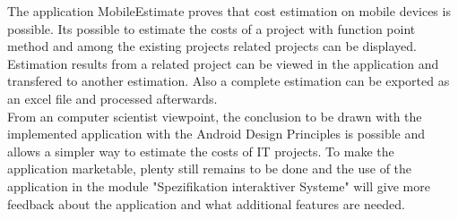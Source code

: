 The application MobileEstimate proves that cost estimation on mobile devices is possible. Its possible to estimate the costs of a project with function point method and among the existing projects related projects can be displayed. Estimation results from a related project can be viewed in the application and transfered to another estimation. Also a complete estimation can be exported as an excel file and processed afterwards.\\
From an computer scientist viewpoint, the conclusion to be drawn with the implemented application with the Android Design Principles is possible and allows a simpler way to estimate the costs of IT projects. To make the application marketable, plenty still remains to be done and the use of the application in the module "Spezifikation interaktiver Systeme" will give more feedback about the application and what additional features are needed.\\
